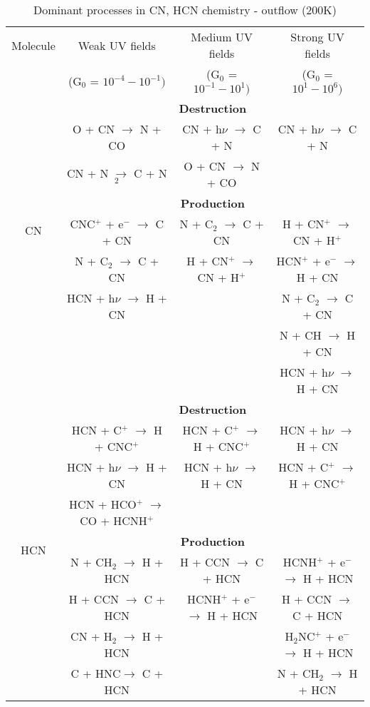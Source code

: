 \documentclass{aa}
\begin{document}
\begin{appendix}
\begin{table*} 
\caption{Dominant processes in CN, HCN chemistry - outflow (200K)} %
\label{reactions_200} %
\begin{tabular}{c c c c} \hline\hline Molecule & Weak UV fields & Medium UV fields & Strong UV fields \\
& (G$_0$ = $10^{-4} - 10^{-1})$ & (G$_0$ = $10^{-1} - 10^{1})$ & (G$_0$ = $10^{1} - 10^{6})$ \\ 
\hline 
\multirow{8}{*}{CN} & \multicolumn{3}{c}{\textbf{Destruction}}\\
&O + CN $\rightarrow$ N + CO & CN + h$\nu$ $\rightarrow$ C + N & CN + h$\nu$ $\rightarrow$ C + N\\
&CN + N $\rightarrow$ C + N$_2$ & O + CN $\rightarrow$ N + CO & \\
\vspace{2.5 pt} & \multicolumn{3}{c}{\textbf{Production}}\\ 
&CNC$^+$ + e$^-$ $\rightarrow$ C + CN & N
+ C$_2$ $\rightarrow$ C + CN & H + CN$^+$ $\rightarrow$ CN + H$^+$\\ 
&N + C$_2$ $\rightarrow$ C + CN & H + CN$^+$ $\rightarrow$ CN + H$^+$ & HCN$^+$ + e$^-$ $\rightarrow$ H + CN \\
&HCN + h$\nu$ $\rightarrow$ H + CN & & N + C$_2$ $\rightarrow$ C + CN\\
& & & N + CH $\rightarrow$ H + CN\\ 
& & & HCN + h$\nu$ $\rightarrow$ H + CN\\ 
\hline 
\multirow{9}{*}{HCN} & \multicolumn{3}{c}{\textbf{Destruction}}\\ 
&HCN + C$^+$ $\rightarrow$ H + CNC$^+$ & HCN + C$^+$ $\rightarrow$ H + CNC$^+$ & HCN + h$\nu$ $\rightarrow$ H + CN\\
&HCN + h$\nu$ $\rightarrow$ H + CN &HCN + h$\nu$ $\rightarrow$ H + CN & HCN + C$^+$ $\rightarrow$ H + CNC$^+$\\
&HCN + HCO$^+$ $\rightarrow$ CO + HCNH$^+$ & & \\
\vspace{2.5 pt} &\multicolumn{3}{c}{\textbf{Production}}\\
&N + CH$_2$ $\rightarrow$ H + HCN & H + CCN $\rightarrow$ C + HCN & HCNH$^+$ + e$^-$ $\rightarrow$ H + HCN\\
&H + CCN $\rightarrow$ C + HCN & HCNH$^+$ + e$^-$ $\rightarrow$ H + HCN & H + CCN $\rightarrow$ C +
HCN\\ &CN + H$_2$ $\rightarrow$ H + HCN & & H$_2$NC$^+$ + e$^-$ $\rightarrow$ H + HCN 
\\ &C + HNC$\rightarrow$ C + HCN & & N + CH$_2$ $\rightarrow$ H + HCN \\ 
\hline 
\end{tabular} 
\end{table*}



\end{appendix}
\end{document}
